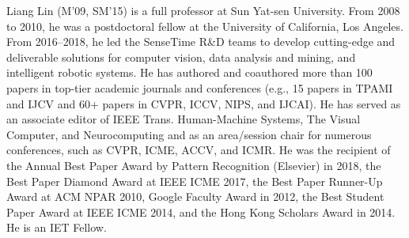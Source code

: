 \documentclass[lettersize,journal]{IEEEtran}
\begin{document}
\begin{IEEEbiography}{Liang Lin} (M'09, SM'15) is a full professor at Sun Yat-sen University. From 2008 to 2010, he was a postdoctoral fellow at the University of California, Los Angeles. From 2016--2018, he led the SenseTime R\&D teams to develop cutting-edge and deliverable solutions for computer vision, data analysis and mining, and intelligent robotic systems. He has authored and coauthored more than 100 papers in top-tier academic journals and conferences (e.g., 15 papers in TPAMI and IJCV and 60+ papers in CVPR, ICCV, NIPS, and IJCAI). He has served as an associate editor of IEEE Trans. Human-Machine Systems, The Visual Computer, and Neurocomputing and as an area/session chair for numerous conferences, such as CVPR, ICME, ACCV, and ICMR. He was the recipient of the Annual Best Paper Award by Pattern Recognition (Elsevier) in 2018, the Best Paper Diamond Award at IEEE ICME 2017, the Best Paper Runner-Up Award at ACM NPAR 2010, Google Faculty Award in 2012, the Best Student Paper Award at IEEE ICME 2014, and the Hong Kong Scholars Award in 2014. He is an IET Fellow. \end{IEEEbiography}
\end{document}
